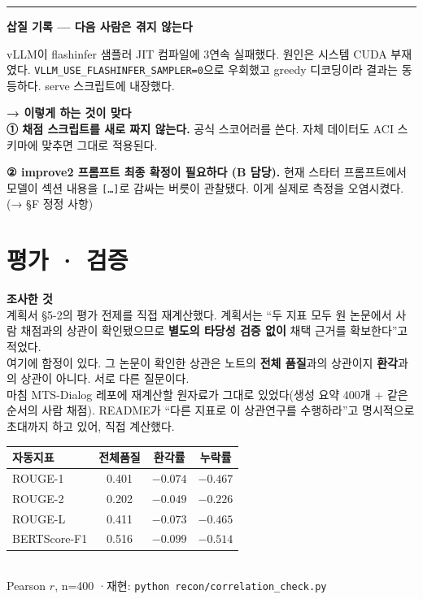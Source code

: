 \documentclass[10.5pt,a4paper]{article}
\newcommand{\investigated}[1]{%
\begin{tcolorbox}[enhanced, blank, breakable,
  borderline west={2.2pt}{0pt}{rulegray},
  left=10pt, right=0pt, top=2pt, bottom=2pt, before skip=6pt, after skip=10pt]
{\footnotesize\bfseries\color{navy}조사한 것}\\[2pt]#1
\end{tcolorbox}}
\newcommand{\finding}[1]{%
\par\vspace{0.9em}\noindent
\textcolor{navy}{\rule[-0.05em]{2.4pt}{0.82em}}\hspace{0.55em}\textbf{#1}\par\nobreak\vspace{0.15em}}
\newcommand{\proposal}[1]{%
\begin{tcolorbox}[enhanced, breakable, colback=softgray, boxrule=0pt, frame hidden,
  borderline west={3pt}{0pt}{navy}, arc=0pt,
  left=12pt, right=10pt, top=8pt, bottom=8pt, before skip=12pt, after skip=8pt,
  before upper={\setlength{\parskip}{0.7em}\setlength{\parindent}{0pt}}]
{\bfseries\color{navy}→ 이렇게 하는 것이 맞다}\\[3pt]#1
\end{tcolorbox}}
\newcommand{\hl}[1]{\textbf{\color{accent}#1}}
\newcommand{\subhead}[1]{\par\vspace{1.0em}{\bfseries\color{navy}#1}\par\vspace{-0.15em}}
\begin{document}
\finding{삽질 기록 — 다음 사람은 겪지 않는다}

vLLM이 flashinfer 샘플러 JIT 컴파일에 3연속 실패했다. 원인은 시스템 CUDA 부재였다. \texttt{VLLM\_USE\allowbreak\_FLASHINFER\allowbreak\_SAMPLER=0}으로 우회했고 greedy 디코딩이라 결과는 동등하다. serve 스크립트에 내장했다.

\proposal{
\textbf{① 채점 스크립트를 새로 짜지 않는다.} 공식 스코어러를 쓴다. 자체 데이터도 ACI 스키마에 맞추면 그대로 적용된다.

\textbf{② improve2 프롬프트 최종 확정이 필요하다 (B 담당).}
현재 스타터 프롬프트에서 모델이 섹션 내용을 \texttt{[\ldots]}로 감싸는 버릇이 관찰됐다. 이게 실제로 측정을 오염시켰다. (→ §F 정정 사항)
}

\section{평가 · 검증}

\investigated{계획서 §5-2의 평가 전제를 직접 재계산했다. 계획서는 ``두 지표 모두 원 논문에서 사람 채점과의 상관이 확인됐으므로 \textbf{별도의 타당성 검증 없이} 채택 근거를 확보한다''고 적었다.\\[4pt]
여기에 함정이 있다. 그 논문이 확인한 상관은 노트의 \textbf{전체 품질}과의 상관이지 \textbf{환각}과의 상관이 아니다. 서로 다른 질문이다.\\[4pt]
마침 MTS-Dialog 레포에 재계산할 원자료가 그대로 있었다(생성 요약 400개 + 같은 순서의 사람 채점). README가 ``다른 지표로 이 상관연구를 수행하라''고 명시적으로 초대까지 하고 있어, 직접 계산했다.}

\subhead{확인된 사실 — 이번 조사 최대 임팩트}

\begin{center}\small
\begin{tabular}{@{}lccc@{}}
\toprule
\textbf{자동지표} & \textbf{전체품질} & \textbf{환각률} & \textbf{누락률} \\
\midrule
ROUGE-1 & 0.401 & \hl{$-0.074$} & $-0.467$ \\
ROUGE-2 & 0.202 & \hl{$-0.049$} & $-0.226$ \\
ROUGE-L & 0.411 & \hl{$-0.073$} & $-0.465$ \\
BERTScore-F1 & 0.516 & \hl{$-0.099$} & $-0.514$ \\
\bottomrule
\end{tabular}
\\[5pt]
{\footnotesize Pearson $r$, n=400 \quad·\quad 재현: \texttt{python recon/correlation\_check.py}}
\end{center}
\end{document}
